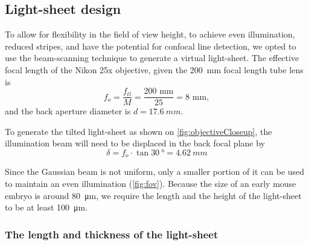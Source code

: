   \subsection{Light-sheet design}
    \label{sec:ls-design}
    To allow for flexibility in the field of view height, to achieve even illumination, reduced stripes, and have the potential for confocal line detection, we opted to use the beam-scanning technique to generate a virtual light-sheet. The effective focal length of the Nikon 25x objective, given the \SI{200}{mm} focal length tube lens is
    \begin{equation}
    f_{o} = \frac{f_{tl}}{M} = \frac{200\text{  mm}}{25} = 8 \text{  mm},
    \end{equation}
    and the back aperture diameter is $d = \SI{17.6}{mm}$.
    
    To generate the tilted light-sheet as shown on \autoref{fig:objectiveCloseup}, the illumination beam will need to be displaced in the back focal plane by
    \begin{equation}
      \delta = f_o \cdot \tan \SI{30}{\degree} = \SI{4.62}{mm}
    \end{equation}
    
    Since the Gaussian beam is not uniform, only a smaller portion of it can be used to maintain an even illumination (\autoref{fig:fov}). Because the size of an early mouse embryo is around \SI{80}{\micro m}, we require the length and the height of the light-sheet to be at least \SI{100}{\micro m}.
    

    \subsubsection{The length and thickness of the light-sheet}
    
